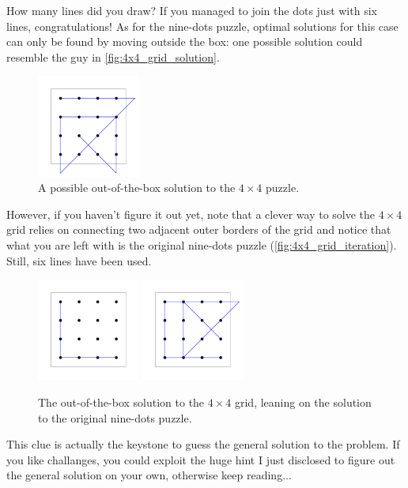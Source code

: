 \documentclass[11pt]{article}
\begin{document}
How many lines did you draw? If you managed to join the dots just with six lines, congratulations! As for the nine-dots puzzle, optimal solutions for this case can only be found by moving outside the box: one possible solution could resemble the guy in \autoref{fig:4x4_grid_solution}.
\begin{figure}[H]
\centering
\includegraphics[width=0.3\textwidth]{images/4x4_grid_solution.png}
\caption{A possible out-of-the-box solution to the $4 \times 4$ puzzle.}
\label{fig:4x4_grid_solution}
\end{figure}
However, if you haven't figure it out yet, note that a clever way to solve the $4 \times 4$ grid relies on connecting two adjacent outer borders of the grid and notice that what you are left with is the original nine-dots puzzle (\autoref{fig:4x4_grid_iteration}). Still, six lines have been used.
\begin{figure}[H]
\centering
\includegraphics[width=0.3\textwidth]{images/4x4_grid_iteration.png}
\includegraphics[width=0.3\textwidth]{images/4x4_grid_iteration_solution.png}
\caption{The out-of-the-box solution to the $4\times 4$ grid, leaning on the solution to the original nine-dots puzzle.}
\label{fig:4x4_grid_iteration}
\end{figure}
This clue is actually the keystone to guess the general solution to the problem. If you like challanges, you could exploit the huge hint I just disclosed to figure out the general solution on your own, otherwise keep reading...\\
\end{document}
